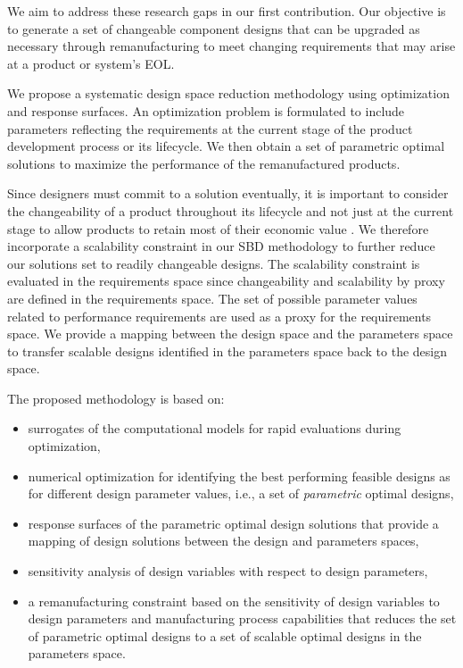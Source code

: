 We aim to address these research gaps in our first contribution. Our objective is to generate a set of changeable component designs that can be upgraded as necessary through remanufacturing to meet changing requirements that may arise at a product or system's \ac{EOL}. 

We propose a systematic design space reduction methodology using optimization and response surfaces. An optimization problem is formulated to include parameters reflecting the requirements at the current stage of the product development process or its lifecycle. We then obtain a set of parametric optimal solutions to maximize the performance of the remanufactured products. 

Since designers must commit to a solution eventually, it is important to consider the {changeability} of a product throughout its lifecycle and not just at the current stage to allow products to retain most of their economic value \cite{Fricke2005}. We therefore incorporate a scalability constraint in our \ac{SBD} methodology to further reduce our solutions set to readily changeable designs. The scalability constraint is evaluated in the requirements space since changeability and scalability by proxy are defined in the requirements space. The set of possible parameter values related to performance requirements are used as a proxy for the requirements space. We provide a mapping between the design space and the parameters space to transfer scalable designs identified in the parameters space back to the design space.

The proposed methodology is based on:
\begin{itemize}
	\item surrogates of the computational models for rapid evaluations during optimization,
	\item numerical optimization for identifying the best performing feasible designs as for different design parameter values, i.e., a set of \textit{parametric} optimal designs,%
	\item response surfaces of the parametric optimal design solutions that provide a mapping of design solutions between the design and parameters spaces,
	\item sensitivity analysis of design variables with respect to design parameters,
	\item a remanufacturing constraint based on the sensitivity of design variables to design parameters and manufacturing process capabilities that reduces the set of parametric optimal designs to a set of {scalable} optimal designs in the parameters space.
\end{itemize}

